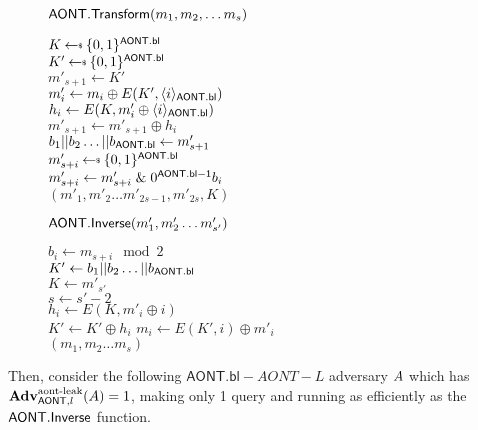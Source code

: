 \documentclass[11pt,twoside]{article}
\begin{document}
\begin{figure}[H]
{
\underline{$\mathsf{AONT.Transform}(m_1,m_2,\dots m_s)$}

\begin{algorithm}[H]
$K\getsr \bits^\schemefont{AONT.bl}$\\
$K'\getsr \bits^\schemefont{AONT.bl}$\\
$m'_{s+1}\gets K'$\\
{
$m'_i\gets m_i \oplus E(K',\langle i \rangle_{\mathsf{AONT.bl}})$\\
$h_i\gets E(K,m'_i\oplus \langle i \rangle_{\mathsf{AONT.bl}})$\\
$m'_{s+1}\gets m'_{s+1}\oplus h_i$\\
}
$b_1||b_2\dots ||b_{\mathsf{AONT.bl}}\gets m'_{s+1}$\\
{
$m'_{s+i}\getsr\bits^\schemefont{AONT.bl}$\\
$m'_{s+i}\gets m'_{s+i} \mathrel{\&} 0^{\mathsf{AONT.bl-1}}b_i$\\
}
\Return $(m'_1,m'_2\dots m'_{2s-1}, m'_{2s}, K)$
\end{algorithm}
}
{
\underline{$\mathsf{AONT.Inverse}(m'_1,m'_2\dots m'_{s'})$}

\begin{algorithm}[H]
{
$b_i \gets m_{s+i} \mod 2$\\
}
$K'\gets b_1||b_2\dots ||b_{\mathsf{AONT.bl}}$\\
$K\gets m'_{s'}$\\
$s\gets s'-2$\\
{
$h_i\gets E(K,m'_i\oplus i)$\\
$K'\gets K'\oplus h_i$
}
{
$m_i\gets E(K',i)\oplus m'_i$\\
}
\Return $(m_1,m_2\dots m_{s})$
\end{algorithm}
}
\end{figure} 

Then, consider the following $\mathsf{AONT.bl}-AONT-L$ adversary $A$ which has $\textbf{Adv}^\text{aont-leak}_{\mathsf{AONT},l}(A)=1$, making only 1 query and running as efficiently as the $\mathsf{AONT.Inverse}$ function.
\end{document}
